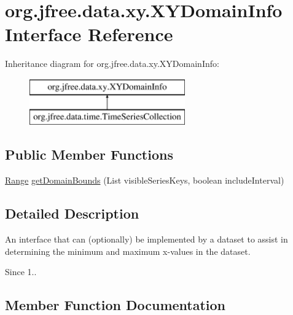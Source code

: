 \hypertarget{interfaceorg_1_1jfree_1_1data_1_1xy_1_1_x_y_domain_info}{}\section{org.\+jfree.\+data.\+xy.\+X\+Y\+Domain\+Info Interface Reference}
\label{interfaceorg_1_1jfree_1_1data_1_1xy_1_1_x_y_domain_info}
Inheritance diagram for org.\+jfree.\+data.\+xy.\+X\+Y\+Domain\+Info\+:\begin{figure}[H]
\begin{center}
\leavevmode
\includegraphics[height=2.000000cm]{interfaceorg_1_1jfree_1_1data_1_1xy_1_1_x_y_domain_info}
\end{center}
\end{figure}
\subsection*{Public Member Functions}
\begin{DoxyCompactItemize}
\item 
\mbox{\hyperlink{classorg_1_1jfree_1_1data_1_1_range}{Range}} \mbox{\hyperlink{interfaceorg_1_1jfree_1_1data_1_1xy_1_1_x_y_domain_info_a04cc3e726daf9493e6f87f6d789be17d}{get\+Domain\+Bounds}} (List visible\+Series\+Keys, boolean include\+Interval)
\end{DoxyCompactItemize}


\subsection{Detailed Description}
An interface that can (optionally) be implemented by a dataset to assist in determining the minimum and maximum x-\/values in the dataset.

\begin{DoxySince}{Since}
1.. 
\end{DoxySince}


\subsection{Member Function Documentation}
\mbox{\label{interfaceorg_1_1jfree_1_1data_1_1xy_1_1_x_y_domain_info_a04cc3e726daf9493e6f87f6d789be17d}} 

